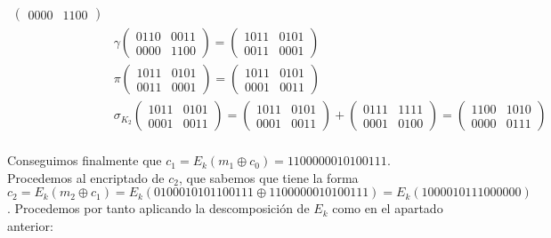 \documentclass[fleqn]{article}
\begin{document}
\begin{equation*}
\begin{aligned}
\begin{pmatrix}
                0000 & 1100
            \end{pmatrix} \\
            &\gamma \begin{pmatrix}
                0110 & 0011 \\
                0000 & 1100
            \end{pmatrix} =
            \begin{pmatrix}
                1011 & 0101 \\
                0011 & 0001
            \end{pmatrix} \\
            &\pi \begin{pmatrix}
                1011 & 0101 \\
                0011 & 0001
            \end{pmatrix} =
            \begin{pmatrix}
                1011 & 0101 \\
                0001 & 0011
            \end{pmatrix} \\
            &\sigma_{K_2} \begin{pmatrix}
                1011 & 0101 \\
                0001 & 0011
            \end{pmatrix} =
            \begin{pmatrix}
                1011 & 0101 \\
                0001 & 0011
            \end{pmatrix} +
            \begin{pmatrix}
                0111 & 1111 \\
                0001 & 0100
            \end{pmatrix} =
            \begin{pmatrix}
                1100 & 1010 \\
                0000 & 0111
            \end{pmatrix} \\
        \end{aligned}
    \end{equation*}

    Conseguimos finalmente que $c_1 = E_k(m_1 \oplus c_0) = 1100000010100111$. Procedemos al encriptado de $c_2$, 
    que sabemos que tiene la forma $c_2 = E_k(m_2 \oplus c_1) = E_k(0100010101100111 \oplus 1100000010100111) = E_k(1000010111000000)$. Procedemos 
    por tanto aplicando la descomposición de $E_k$ como en el apartado anterior:
\end{document}
